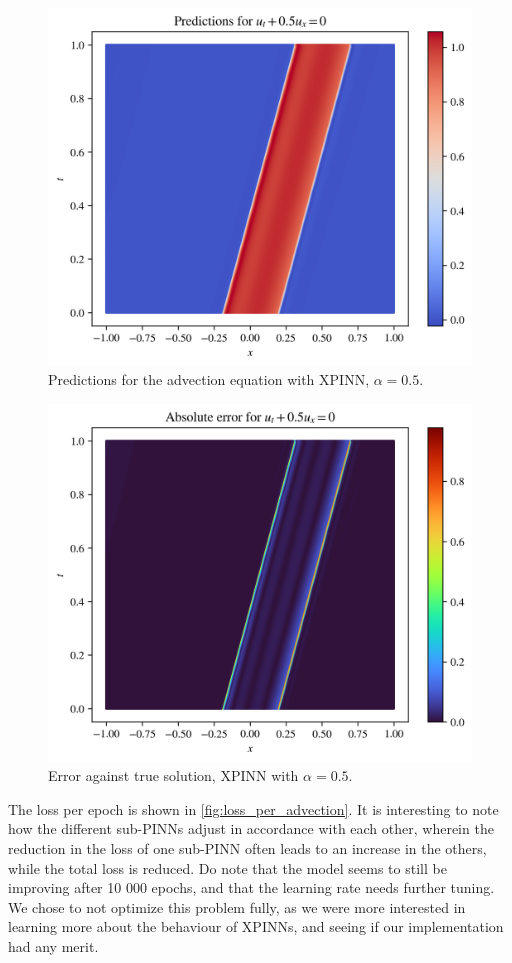 \begin{figure}[h]
    \centering
    \includegraphics[width=0.8\linewidth]{Project1XPINNs/figures/advection/0.5_predictions.png}
    \caption{Predictions for the advection equation with XPINN, $\alpha = 0.5$.}
    \label{fig:advection_xpinn_pred}
\end{figure}

\begin{figure}[h]
    \centering
    \includegraphics[width=0.8\linewidth]{Project1XPINNs/figures/advection/0.5_error.png}
    \caption{Error against true solution, XPINN with $\alpha=0.5$.}
    \label{fig:advection_xpinn_error}
\end{figure}

The loss per epoch is shown in \autoref{fig:loss_per_advection}.
It is interesting to note how the different sub-PINNs adjust in accordance with each other, wherein the reduction in the loss of one sub-PINN often leads to an increase in the others, while the total loss is reduced.
Do note that the model seems to still be improving after 10 000 epochs, and that the learning rate needs further tuning.
We chose to not optimize this problem fully, as we were more interested in learning more about the behaviour of XPINNs, and seeing if our implementation had any merit.


